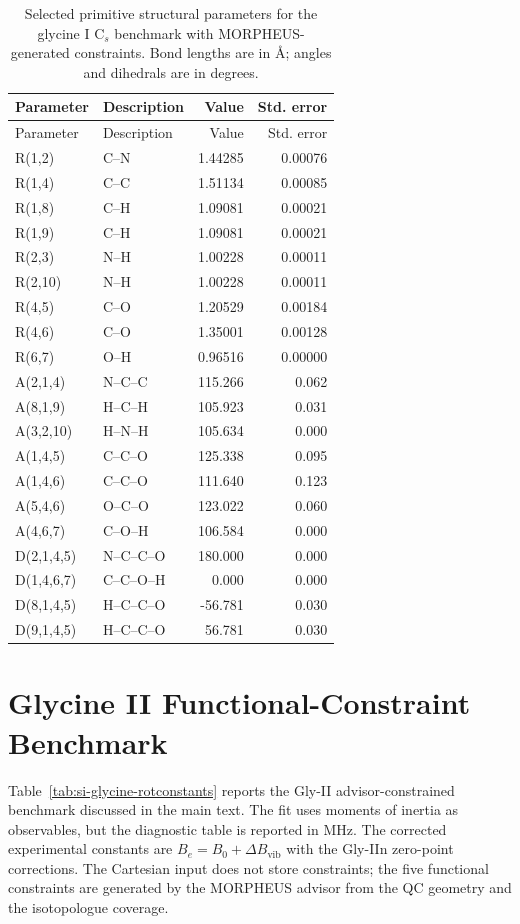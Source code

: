 \documentclass[12pt]{article}
\begin{document}
\begin{longtable}{llrr}
\caption{Selected primitive structural parameters for the glycine I C$_s$ benchmark with MORPHEUS-generated constraints. Bond lengths are in \AA; angles and dihedrals are in degrees.}\label{tab:si-glycine-I-geometry}\\
\toprule
Parameter & Description & Value & Std. error \\
\midrule
\endfirsthead
\toprule
Parameter & Description & Value & Std. error \\
\midrule
\endhead
R(1,2) & C--N & 1.44285 & 0.00076 \\
R(1,4) & C--C & 1.51134 & 0.00085 \\
R(1,8) & C--H & 1.09081 & 0.00021 \\
R(1,9) & C--H & 1.09081 & 0.00021 \\
R(2,3) & N--H & 1.00228 & 0.00011 \\
R(2,10) & N--H & 1.00228 & 0.00011 \\
R(4,5) & C--O & 1.20529 & 0.00184 \\
R(4,6) & C--O & 1.35001 & 0.00128 \\
R(6,7) & O--H & 0.96516 & 0.00000 \\
A(2,1,4) & N--C--C & 115.266 & 0.062 \\
A(8,1,9) & H--C--H & 105.923 & 0.031 \\
A(3,2,10) & H--N--H & 105.634 & 0.000 \\
A(1,4,5) & C--C--O & 125.338 & 0.095 \\
A(1,4,6) & C--C--O & 111.640 & 0.123 \\
A(5,4,6) & O--C--O & 123.022 & 0.060 \\
A(4,6,7) & C--O--H & 106.584 & 0.000 \\
D(2,1,4,5) & N--C--C--O & 180.000 & 0.000 \\
D(1,4,6,7) & C--C--O--H & 0.000 & 0.000 \\
D(8,1,4,5) & H--C--C--O & -56.781 & 0.030 \\
D(9,1,4,5) & H--C--C--O & 56.781 & 0.030 \\
\bottomrule
\end{longtable}

\section{Glycine II Functional-Constraint Benchmark}

Table~\ref{tab:si-glycine-rotconstants} reports the Gly-II advisor-constrained
benchmark discussed in the main text. The fit uses moments of inertia as
observables, but the diagnostic table is reported in MHz. The corrected
experimental constants are $B_e=B_0+\Delta B_\mathrm{vib}$ with the Gly-IIn
zero-point corrections. The Cartesian input does not store constraints; the
five functional constraints are generated by the MORPHEUS advisor from the QC
geometry and the isotopologue coverage.
\end{document}
